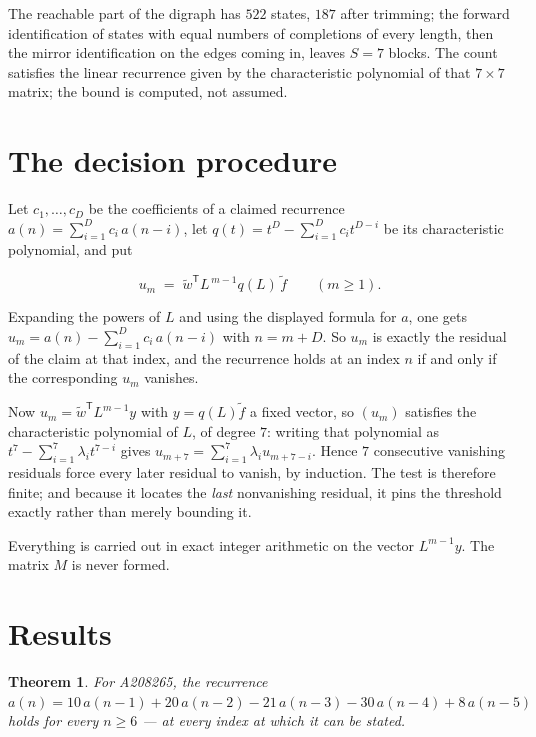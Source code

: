 \documentclass[11pt]{article}
\newtheorem{theorem}{Theorem}
\theoremstyle{definition}
\begin{document}
The reachable part of the digraph has $522$ states, $187$ after trimming; the forward identification of states with equal numbers of completions of every length, then the mirror identification on the edges coming in, leaves $S = 7$ blocks. The count satisfies the linear recurrence given by the characteristic polynomial of that $7\times7$ matrix; the bound is computed, not assumed.

\section{The decision procedure}

Let $c_1,\dots,c_D$ be the coefficients of a claimed recurrence $a(n) = \sum_{i=1}^{D} c_i\,a(n-i)$, let $q(t) = t^{D} - \sum_{i=1}^{D} c_i t^{D-i}$ be its characteristic polynomial, and put

\[u_m \;=\; \tilde w^{\mathsf T} L^{\,m-1} q(L)\,\tilde f \qquad (m \ge 1).\]

Expanding the powers of $L$ and using the displayed formula for $a$, one gets $u_m = a(n) - \sum_{i=1}^{D} c_i\,a(n-i)$ with $n = m + D$. So $u_m$ is exactly the residual of the claim at that index, and the recurrence holds at an index $n$ if and only if the corresponding $u_m$ vanishes.

Now $u_m = \tilde w^{\mathsf T} L^{m-1} y$ with $y = q(L)\tilde f$ a fixed vector, so $(u_m)$ satisfies the characteristic polynomial of $L$, of degree $7$: writing that polynomial as $t^{7} - \sum_{i=1}^{7} \lambda_i t^{7-i}$ gives $u_{m+7} = \sum_{i=1}^{7} \lambda_i u_{m+7-i}$. Hence $7$ consecutive vanishing residuals force every later residual to vanish, by induction. The test is therefore finite; and because it locates the {\itshape last} nonvanishing residual, it pins the threshold exactly rather than merely bounding it.

Everything is carried out in exact integer arithmetic on the vector $L^{m-1}y$. The matrix $M$ is never formed.

\section{Results}

\begin{theorem} For A208265, the recurrence $a(n) = 10\,a(n-1) + 20\,a(n-2) - 21\,a(n-3) - 30\,a(n-4) + 8\,a(n-5)$ holds for every $n \ge 6$ --- at every index at which it can be stated.\end{theorem}
\end{document}
